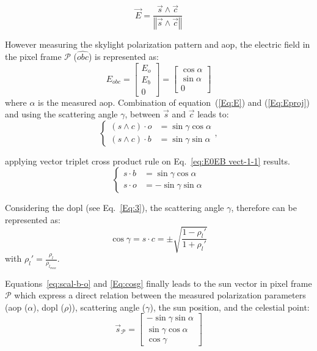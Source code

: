 \begin{equation}
\vec{E}=\frac{\vec{s}\wedge \vec{c}}{\left\Vert \vec{s}\wedge
    \vec{c}\right\Vert }
\label{Eq:E}
\end{equation}

However measuring the skylight polarization pattern and \gls{aop}, the electric
field in the pixel frame $\mathcal{P}$ ($\widehat{obc}$) is represented as:
\begin{equation}
E_{obc}=\left[\begin{array}{l}
E_{o}\\
E_{b}\\
0
\end{array}\right]=\left[\begin{array}{l}
\cos\alpha\\
\sin\alpha\\
0
\end{array}\right]
\label{Eq:Eproj}
\end{equation}
\noindent where $\alpha$ is the measured \gls{aop}.
Combination of equation~(\ref{Eq:E}) and (\ref{Eq:Eproj}) and using the
scattering angle $\gamma$, between $\vec{s}$ and $\vec{c}$ leads to:
\begin{equation}
\begin{cases}
(s\wedge c)\cdot o & =\sin\gamma\cos\alpha\\
(s\wedge c)\cdot b & =\sin\gamma\sin\alpha
\end{cases},\label{eq:E0EB vect-1-1}
\end{equation}

\noindent applying vector triplet cross product rule on Eq.~\ref{eq:E0EB
  vect-1-1} results.
\begin{equation}
\begin{cases}
s\cdot b & =\sin\gamma\cos\alpha\\
s\cdot o & =-\sin\gamma\sin\alpha
\end{cases}\label{eq:scal-b-o}
\end{equation}

Considering the \gls{dopl} (see Eq.~\ref{Eq:3}), the scattering angle
$\gamma$, therefore can be represented as:
\begin{equation}
\cos\gamma=s\cdot c=\pm\sqrt{\frac{1-\rho_{l}'}{1+\rho_{l}'}}
\label{Eq:cosg}
\end{equation}
\noindent with $\rho_{l}'=\frac{\rho_{l}}{\rho_{l_{max}}}.$

Equations~\ref{eq:scal-b-o} and \ref{Eq:cosg} finally leads to the sun vector
in pixel frame $\mathcal{P}$ which express a direct relation between the
measured polarization parameters (\gls{aop} ($\alpha$), \gls{dopl} ($\rho$)),
scattering angle ($\gamma$), the sun position,  and the celestial point:
\begin{equation}
  \label{Eq:sunp}
  \vec{s}_{\mathcal{P}} =
  \left[
    \begin{array}{l}
    -\sin\gamma \sin\alpha\\
    \sin\gamma \cos\alpha\\
    \cos\gamma
  \end{array}
  \right]
\end{equation}

